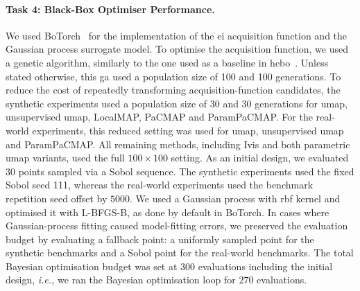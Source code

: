 \paragraph*{Task 4: Black-Box Optimiser Performance.}
We used BoTorch~\citep{BalEtAl20} for the implementation of the \gls{ei} acquisition function and the Gaussian process surrogate model.
To optimise the acquisition function, we used a genetic algorithm, similarly to the one used as a baseline in \gls{hebo}~\citep{CowEtAl22}. Unless stated otherwise, this \gls{ga} used a population size of 100 and 100 generations. To reduce the cost of repeatedly transforming acquisition-function candidates, the synthetic experiments used a population size of 30 and 30 generations for \gls{umap}, unsupervised \gls{umap}, LocalMAP, PaCMAP and ParamPaCMAP. For the real-world experiments, this reduced setting was used for \gls{umap}, unsupervised \gls{umap} and ParamPaCMAP. All remaining methods, including Ivis and both parametric \gls{umap} variants, used the full $100 \times 100$ setting.
As an initial design, we evaluated 30 points sampled via a Sobol sequence. The synthetic experiments used the fixed Sobol seed 111, whereas the real-world experiments used the benchmark repetition seed offset by $5000$.
We used a Gaussian process with \gls{rbf} kernel and optimised it with L-BFGS-B, as done by default in BoTorch.
In cases where Gaussian-process fitting caused model-fitting errors, we preserved the evaluation budget by evaluating a fallback point: a uniformly sampled point for the synthetic benchmarks and a Sobol point for the real-world benchmarks.
The total Bayesian optimisation budget was set at $300$ evaluations including the initial design, \emph{i.e.,} we ran the Bayesian optimisation loop for $270$ evaluations.


